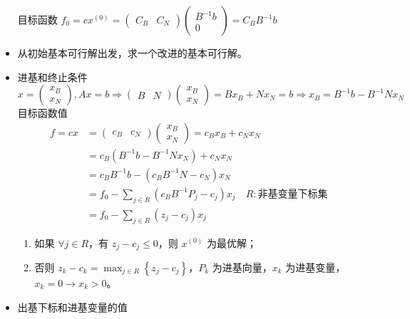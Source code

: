 \begin{remark}
\begin{itemize}
            目标函数 $f_0 = cx^{(0)} = \begin{pmatrix}
                C_B & C_N
            \end{pmatrix} \begin{pmatrix}
                B^{-1}b \\
                0
            \end{pmatrix} = C_BB^{-1}b$
        \item 从初始基本可行解出发，求一个改进的基本可行解。
        \item 进基和终止条件
            \[x=\left(\begin{array}{l}
                x_{B} \\
                x_{N}
                \end{array}\right),A x=b \Rightarrow\begin{pmatrix}
                    B & N
                \end{pmatrix}\left(\begin{array}{l}
                x_{B} \\
                x_{N}
                \end{array}\right)=B x_{B}+N x_{N}=b \Rightarrow x_{B}=B^{-1}b-B^{-1} N x_{N}\]
            目标函数值
            \begin{align*}
                f = cx &= \begin{pmatrix}
                    c_B & c_N
                \end{pmatrix}\begin{pmatrix}
                    x_B \\
                    x_N
                \end{pmatrix} = c_Bx_B + c_Nx_N \\
                &= c_B(B^{-1}b - B^{-1}Nx_N) + c_Nx_N \\
                &= c_BB^{-1}b - (c_BB^{-1}N - c_N)x_N \\
                &= f_0 - \sum_{j\in R}(c_BB^{-1}P_j - c_j)x_j \quad R :\text{非基变量下标集} \\
                &=f_0 - \sum_{j\in R}(z_j - c_j)x_j
            \end{align*}
            \begin{enumerate}
                \item 如果 $\forall j\in R$，有 $z_j - c_j \le 0$，则 $x^{(0)}$ 为最优解；
                \item 否则 $z_k - c_k = \max_{j \in R}\left\{z_j - c_j\right\}$，$P_k$ 为进基向量，$x_k$ 为进基变量，$x_k = 0 \to x_k > 0$。
            \end{enumerate}
        \item 出基下标和进基变量的值
        

\end{itemize}
\end{remark}

